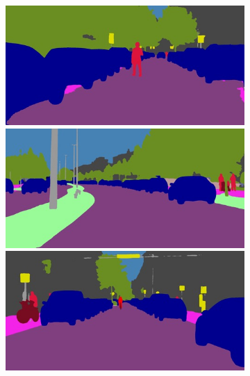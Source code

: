 {\begin{figure}[t]
{{\begin{subfigure}[t]{0.24\linewidth}
\begin{center}
		\includegraphics[width=\linewidth,trim={0px 60px 0 0px},clip]{qualitative/bielefeld_000000_027586_semantic_segmentation_rgb.jpg}
		\includegraphics[width=\linewidth,trim={0px 60px 0 0px},clip]{qualitative/munich_000026_000019_semantic_segmentation_rgb.jpg}
		\includegraphics[width=\linewidth,trim={0px 60px 0 0px},clip]{qualitative/munich_000306_000019_semantic_segmentation_rgb.jpg}

\end{center}
\end{subfigure}}}
\end{figure}}

